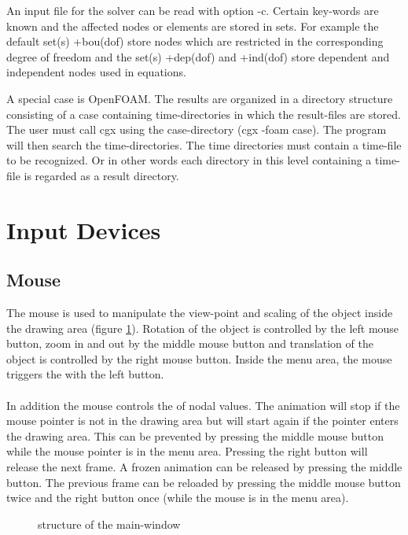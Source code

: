 \documentclass{article}
\begin{document}
An input file for the solver can be read with option -c. Certain key-words are known and the affected nodes or elements are stored in sets. For example the default set(s) +bou(dof) store nodes which are restricted in the corresponding degree of freedom and the set(s) +dep(dof) and +ind(dof) store dependent and independent nodes used in equations.

A special case is OpenFOAM. The results are organized in a directory structure consisting of a case containing time-directories in which the result-files are stored. The user must call cgx using the case-directory (cgx -foam case). The program will then search the time-directories. The time directories must contain a time-file to be recognized. Or in other words each directory in this level containing a time-file is regarded as a result directory.

\section{\label{Input Devices}Input Devices}

\subsection{\label{Mouse}Mouse}
The mouse is used to manipulate the view-point and scaling of the object inside the drawing area (figure \ref{mainwindow}). Rotation of the object is controlled by the left mouse button, zoom in and out by the middle mouse button and translation of the object is controlled by the right mouse button. Inside the menu area, the mouse triggers the  with the left button.\\\\In addition the mouse controls the  of nodal values. The animation will stop if the mouse pointer is not in the drawing area but will start again if the pointer enters the drawing area. This can be prevented by pressing the middle mouse button while the mouse pointer is in the menu area.  Pressing the right button will release the next frame. A frozen animation can be released by pressing the middle button. The previous frame can be reloaded by pressing the middle mouse button twice and the right button once (while the mouse is in the menu area).
  
\begin{figure}[h]
\caption{\label{mainwindow}structure of the main-window}
\end{figure}
\end{document}
